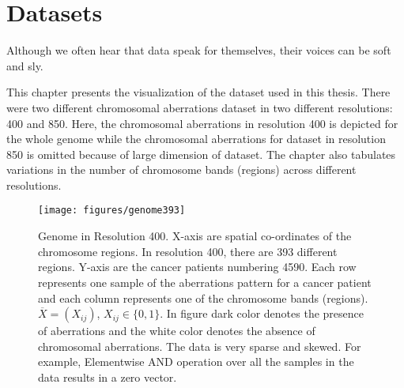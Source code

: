 \chapter{Datasets}
\label{ap:appendData}

\begin{fquote} Although we often hear that data speak for themselves, their voices can be soft and sly.   \end{fquote} 

\vspace{1cm}

\begin{synopsis}
This chapter presents the visualization of the dataset used in this thesis. There were two different chromosomal aberrations dataset in two different resolutions: 400 and 850. Here, the chromosomal aberrations in resolution 400 is depicted for the whole genome while the chromosomal aberrations for dataset in resolution 850 is omitted because of large dimension of dataset. The chapter also tabulates variations in the number of chromosome bands (regions) across different resolutions.

\end{synopsis}

\clearpage



\begin{figure}[h!]
\centering
\texttt{[image: figures/genome393]}
\caption[Genome in Resolution 400]{Genome in Resolution 400. X-axis are spatial co-ordinates of the chromosome regions. In resolution 400, there are 393 different regions. Y-axis are the cancer patients numbering 4590. Each row represents one sample of the aberrations pattern for a cancer patient and each column represents one of the chromosome bands (regions). $\overline{X}=(X_{ij})$, $X_{ij}\in \{0,1\}$. In figure dark color denotes the presence of aberrations and the white color denotes the absence of chromosomal aberrations. The data is very sparse and skewed. For example, Elementwise AND operation over all the samples in the data results in a zero vector.} \label{Fig:genome303}
\end{figure}


